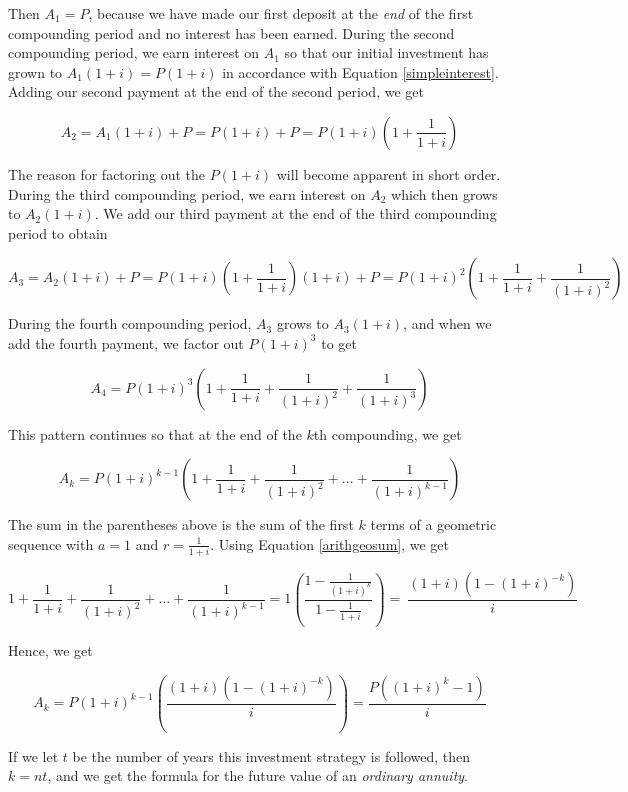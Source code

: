 \documentclass{ximera}
\begin{document}
Then $A_{1} = P$, because we have  made our first deposit at the \textit{end} of the first compounding period and no interest has been earned.  During the second compounding period, we earn interest on $A_{1}$ so that our initial investment has grown to $A_{1}(1+i) = P(1+i)$ in accordance with Equation \ref{simpleinterest}.  Adding our second payment at the end of the second period, we get

\[A_{2} = A_{1}(1+i) + P = P(1+i) + P = P(1+i)\left(1 + \frac{1}{1+i}\right)\]

The reason for factoring out the $P(1+i)$ will become apparent in short order. During the third compounding period, we earn interest on $A_{2}$ which then grows to $A_{2}(1+i)$.  We add our third payment at the end of the third compounding period to obtain

\[A_{3} = A_{2}(1+i) + P = P(1+i)\left(1 + \frac{1}{1+i}\right)(1+i) + P = P(1+i)^2\left(1 + \frac{1}{1+i} + \frac{1}{(1+i)^2}\right)\]

During the fourth compounding period, $A_{3}$ grows to $A_{3}(1+i)$, and when we add the fourth payment, we factor out $P(1+i)^3$ to get

\[A_{4} = P(1+i)^3 \left(1 + \frac{1}{1+i} + \frac{1}{(1+i)^2} + \frac{1}{(1+i)^3}\right)\]

This pattern continues so that at the end of the $k$th compounding, we get 

\[A_{k} = P(1+i)^{k-1} \left(1 + \frac{1}{1+i} + \frac{1}{(1+i)^2} + \ldots + \frac{1}{(1+i)^{k-1}}\right) \]

The sum in the parentheses above is the sum of the first $k$ terms of a geometric sequence with $a = 1$ and $r = \frac{1}{1+i}$.  Using Equation \ref{arithgeosum}, we get

\[1 + \frac{1}{1+i} + \frac{1}{(1+i)^2} + \ldots + \frac{1}{(1+i)^{k-1}} = 1 \left(\frac{1 - \frac{1}{(1+i)^k}}{1 - \frac{1}{1+i}}\right) = \
\frac{(1+i)\left(1 - (1+i)^{-k}\right)}{i}\]

Hence, we get

\[A_{k} = P(1+i)^{k-1} \left(\frac{(1+i)\left(1 - (1+i)^{-k}\right)}{i}\right) = \frac{P\left((1+i)^k - 1\right)}{i}\]

If we let $t$ be the number of years this investment strategy is followed, then $k = nt$, and we get the formula for the future value of an  \textit{ordinary annuity}.

 

\end{document}
